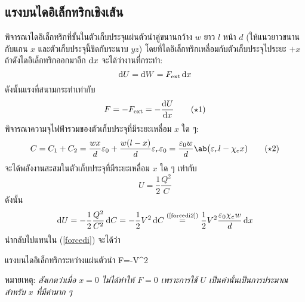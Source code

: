 \subsection{แรงบนไดอิเล็กทริกเชิงเส้น}
พิจารณาไดอิเล็กทริกที่ขั้นในตัวเก็บประจุแผ่นตัวนำคู่ขนานกว้าง $w$ ยาว $l$ หน้า $d$ (ให้แนวยาวขนานกับแกน $x$ และตัวเก็บประจุนี้ชิดกับระนาบ $yz$) โดยที่ไดอิเล็กทริกเหลื่อมกับตัวเก็บประจุไประยะ $+x$ ถ้าดังไดอิเล็กทริกออกมาอีก $\odif{x}$ จะได้ว่างานที่กระทำ:
\[
\odif{U}=\odif{W}=F_\txt{ext}\odif{x}
\]
ดังนั้นแรงที่สนามกระทำเท่ากับ
\begin{equation}
    F=-F_\txt{ext}=-\odv{U}{x}\tag{$\star$1}\label{forcedi}
\end{equation}
พิจารณาความจุไฟฟ้ารวมของตัวเก็บประจุที่มีระยะเหลื่อม $x$ ใด ๆ:
\begin{equation}
C=C_1+C_2=\frac{wx}{d}\eps_0+\frac{w(l-x)}{d}\eps_r\eps_0=\frac{\eps_0w}{d}\ab\big(\eps_rl-\chi_ex)\tag{$\star$2}\label{forcedi2}
\end{equation}
จะได้พลังงานสะสมในตัวเก็บประจุที่มีระยะเหลื่อม $x$ ใด ๆ เท่ากับ
\[
U=\frac{1}{2}\frac{Q^2}{C}
\]
ดังนั้น
\[
\odif{U}=-\frac{1}{2}\frac{Q^2}{C^2}\odif{C}=-\frac{1}{2}V^2\odif{C}\overset{\text{(\ref{forcedi2})}}{=}\frac{1}{2}V^2\frac{\eps_0\chi_ew}{d}\odif{x}
\]
นำกลับไปแทนใน (\ref{forcedi}) จะได้ว่า
\begin{eqbox}{แรงบนไดอิเล็กทริกระหว่างแผ่นตัวนำ}
    F=-V^2
\end{eqbox}
หมายเหตุ: \emph{สังเกตว่าเมื่อ $x=0$ ไม่ได้ทำให้ $F=0$ เพราะการใช้ $U$ เป็นค่านั้นเป็นการประมาณสำหรับ $x$ ที่มีค่ามาก ๆ}